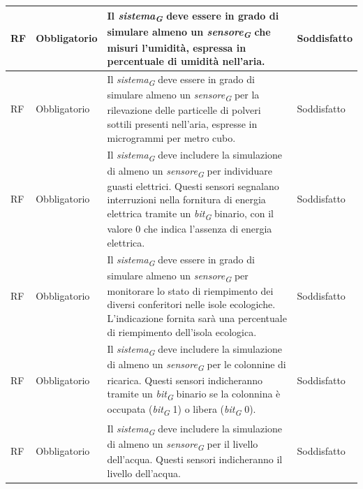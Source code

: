 \begin{longtable}{|C{1.5cm}|C{2cm}|L{5cm}|C{2cm}|}
    \hline
     RF & Obbligatorio &  Il \textit{sistema}\textsubscript{\textit{G}} deve essere in grado di simulare almeno un \textit{sensore}\textsubscript{\textit{G}} che misuri l'umidità, espressa in percentuale di umidità nell'aria. & Soddisfatto \\
    
    \hline
     RF & Obbligatorio &  Il \textit{sistema}\textsubscript{\textit{G}} deve essere in grado di simulare almeno un \textit{sensore}\textsubscript{\textit{G}} per la rilevazione delle particelle di polveri sottili presenti nell'aria, espresse in microgrammi per metro cubo. & Soddisfatto \\
    
    \hline
     RF & Obbligatorio &  Il \textit{sistema}\textsubscript{\textit{G}} deve includere la simulazione di almeno un \textit{sensore}\textsubscript{\textit{G}} per individuare guasti elettrici. Questi sensori segnalano interruzioni nella fornitura di energia elettrica tramite un \textit{bit}\textsubscript{\textit{G}} binario, con il valore 0 che indica l'assenza di energia elettrica. & Soddisfatto \\
    
    \hline
     RF & Obbligatorio &  Il \textit{sistema}\textsubscript{\textit{G}} deve essere in grado di simulare almeno un \textit{sensore}\textsubscript{\textit{G}} per monitorare lo stato di riempimento dei diversi conferitori nelle isole ecologiche. L'indicazione fornita sarà una percentuale di riempimento dell'isola ecologica. & Soddisfatto \\
    
    \hline
     RF & Obbligatorio & Il \textit{sistema}\textsubscript{\textit{G}} deve includere la simulazione di almeno un \textit{sensore}\textsubscript{\textit{G}} per le colonnine di ricarica. Questi sensori indicheranno tramite un \textit{bit}\textsubscript{\textit{G}} binario se la colonnina è occupata (\textit{bit}\textsubscript{\textit{G}} 1) o libera (\textit{bit}\textsubscript{\textit{G}} 0). & Soddisfatto \\
    
    \hline
     RF & Obbligatorio & Il \textit{sistema}\textsubscript{\textit{G}} deve includere la simulazione di almeno un \textit{sensore}\textsubscript{\textit{G}} per il livello dell'acqua. Questi sensori indicheranno il livello dell'acqua.& Soddisfatto \\
    

\end{longtable}
